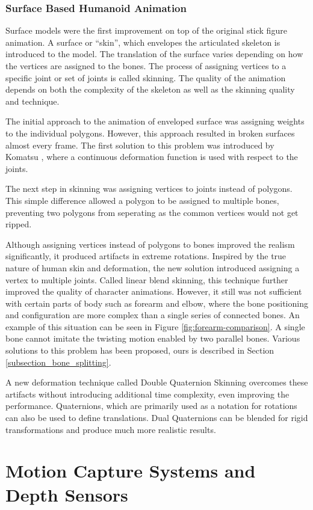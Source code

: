 \subsubsection{Surface Based Humanoid Animation}
Surface models were the first improvement on top of the original stick figure animation. A surface or ``skin'', which envelopes the articulated skeleton is 
introduced to the model. The translation of the surface varies depending on how the vertices are assigned to the bones. The process of assigning vertices to 
a specific joint or set of joints is called skinning. The quality of the animation depends on both the complexity of the skeleton as well as the skinning 
quality and technique. 

The initial approach to the animation of enveloped surface was assigning weights to the individual polygons. However, this approach resulted in broken surfaces
almost every frame. The first solution to this problem was introduced by Komatsu \cite{Komatsu1988}, where a continuous deformation function is used with respect 
to the joints. 

The next step in skinning was assigning vertices to joints instead of polygons\cite{Lander1988}. This simple difference allowed a polygon to be assigned to multiple bones, 
preventing two polygons from seperating as the common vertices would not get ripped.

Although assigning vertices instead of polygons to bones improved the realism significantly, it produced artifacts in extreme rotations. Inspired by the true 
nature of human skin and deformation, the new solution introduced assigning a vertex to multiple joints. Called linear blend skinning, this technique further 
improved the quality of character animations. However, it still was not sufficient with certain parts of body such as forearm and elbow, where the bone 
positioning and configuration are more complex than a single series of connected bones. An example of this situation can be seen in Figure \ref{fig:forearm-comparison}.
A single bone cannot imitate the twisting motion enabled by two parallel bones. Various solutions to this problem has been proposed, ours is described in 
Section \ref{subsection_bone_splitting}. 

A new deformation technique called Double Quaternion Skinning overcomes these artifacts without introducing additional time complexity\cite{Kavan2007}, even 
improving the performance. Quaternions, which are primarily used as a notation for rotations can also be used to define translations. Dual Quaternions can 
be blended for rigid transformations and produce much more realistic results.


 
\section{Motion Capture Systems and Depth Sensors}
\label{section_related_mocap}
 